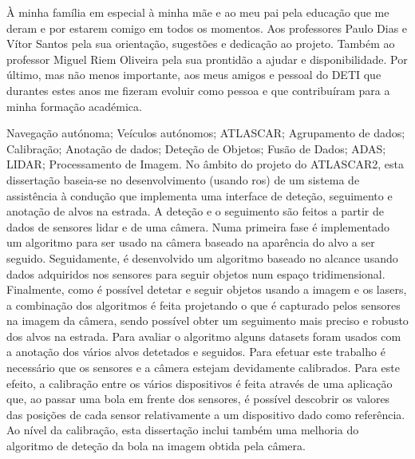 \documentclass[11pt,twoside,a4paper]{report}
\begin{document}
\TitlePage
  \vspace*{55mm}
       {\`A minha fam\'ilia em especial \`a minha m\~ae e ao meu pai pela educa\c c\~ao que me deram e por estarem comigo em todos os momentos. Aos professores Paulo Dias e V\'itor Santos pela sua orienta\c c\~ ao, sugest\~oes e dedica\c c\~ ao ao projeto. Tamb\'em ao professor Miguel Riem Oliveira pela sua prontid\~ao a ajudar e disponibilidade.}
  \TEXT{}
       {Por \'ultimo, mas n\~ao menos importante, aos meus amigos e pessoal do DETI que durantes estes anos me fizeram evoluir como pessoa e que contribu\'iram para a minha forma\c c\~ ao acad\' emica.}
\EndTitlePage
\titlepage\ \endtitlepage %

\TitlePage
  \vspace*{55mm}
  {Navega{\c c}\~ao aut\'onoma; Ve\'iculos aut\'onomos; ATLASCAR; Agrupamento de dados; Calibra{\c c}\~ao; Anota\c c\~ao de dados; Dete\c c\~ao de Objetos; Fus\~ao de Dados; ADAS; LIDAR; Processamento de Imagem.}
  \vspace*{5mm}
       {No \^ambito do projeto do ATLASCAR2, esta disserta\c c\~ao baseia-se no desenvolvimento (usando \gls{ros}) de um sistema de assist\^encia \`a condu\c c\~ao que implementa uma interface de dete\c c\~ao, seguimento e anota\c c\~ao de alvos na estrada. A dete\c c\~ao e o seguimento s\~ao feitos a partir de dados de sensores \gls{lidar} e de uma c\^amera. Numa primeira fase \'e implementado um algoritmo para ser usado na c\^amera baseado na apar\^encia do alvo a ser seguido. Seguidamente, \'e desenvolvido um algoritmo baseado no alcance usando dados adquiridos nos sensores para seguir objetos num espa\c co tridimensional. Finalmente, como \'e poss\'ivel detetar e seguir objetos usando a imagem e os lasers, a combina\c c\~ao dos algoritmos \'e feita  projetando o que \'e capturado pelos sensores na imagem da c\^amera, sendo poss\'ivel obter um seguimento mais preciso e robusto dos alvos na estrada. Para avaliar o algoritmo alguns datasets foram usados com a anota\c c\~ao dos v\'arios alvos detetados e seguidos. Para efetuar este trabalho \'e necess\'ario que os sensores e a c\^amera estejam devidamente calibrados. Para este efeito, a calibra\c c\~ao entre os v\'arios dispositivos \'e feita atrav\'es de uma aplica\c c\~ao que, ao passar uma bola em frente dos sensores, \'e poss\'ivel descobrir os valores das posi\c c\~oes de cada sensor relativamente a um dispositivo dado como refer\^encia. Ao n\'ivel da calibra\c c\~ao, esta disserta\c c\~ao inclui tamb\'em uma melhoria do algoritmo de dete\c c\~ao da bola na imagem obtida pela c\^amera.}
\EndTitlePage
\titlepage\ \endtitlepage %
\end{document}
